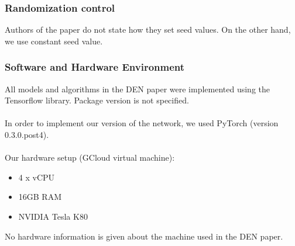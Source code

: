 \documentclass[12pt]{article}
\begin{document}
    
    \subsubsection{Randomization control}
    Authors of the paper do not state how they set seed values. On the other hand, we use constant
    seed value.
    
    \subsubsection{Software and Hardware Environment}
    All models and algorithms in the DEN paper were implemented using the Tensorflow library.
    Package version is not specified.
    \\
    \\
    In order to implement our version of the network, we used PyTorch (version 0.3.0.post4).
    \\
    \\
    Our hardware setup (GCloud virtual machine):
    \begin{itemize}
        \item 4 x vCPU
        \item 16GB RAM
        \item NVIDIA Tesla K80
    \end{itemize}
    \bigskip
    No hardware information is given about the machine used in the DEN paper.

    
\end{document}
